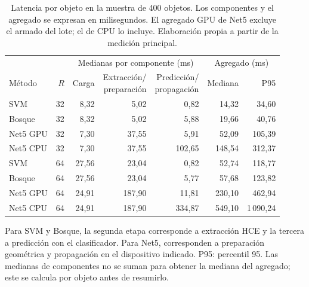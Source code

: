 \begin{table}[htbp]\centering\small
\caption{Latencia por objeto en la muestra de 400 objetos. Los componentes y el agregado se expresan en milisegundos. El agregado GPU de Net5 excluye el armado del lote; el de CPU lo incluye. Elaboración propia a partir de la medición principal.}\label{tab:latencia-final}
\setlength{\tabcolsep}{3pt}
\begin{tabular}{@{}lr rrr rr@{}}\toprule
& & \multicolumn{3}{c}{Medianas por componente (ms)} & \multicolumn{2}{c}{Agregado (ms)} \\
\cmidrule(lr){3-5}\cmidrule(l){6-7}
Método & $R$ & Carga & \shortstack{Extracción/\\preparación} & \shortstack{Predicción/\\propagación} & Mediana & P95 \\\midrule
SVM & 32 & 8,32 & 5,02 & 0,82 & 14,32 & 34,60 \\
Bosque & 32 & 8,32 & 5,02 & 5,88 & 19,66 & 40,76 \\
Net5 GPU & 32 & 7,30 & 37,55 & 5,91 & 52,09 & 105,39 \\
Net5 CPU & 32 & 7,30 & 37,55 & 102,65 & 148,54 & 312,37 \\
SVM & 64 & 27,56 & 23,04 & 0,82 & 52,74 & 118,77 \\
Bosque & 64 & 27,56 & 23,04 & 5,77 & 57,68 & 123,82 \\
Net5 GPU & 64 & 24,91 & 187,90 & 11,81 & 230,10 & 462,94 \\
Net5 CPU & 64 & 24,91 & 187,90 & 334,87 & 549,10 & 1\,090,24 \\
\bottomrule\end{tabular}
\par\smallskip\begin{minipage}{\textwidth}\footnotesize
Para SVM y Bosque, la segunda etapa corresponde a extracción HCE y la tercera a predicción con el clasificador. Para Net5, corresponden a preparación geométrica y propagación en el dispositivo indicado. P95: percentil 95. Las medianas de componentes no se suman para obtener la mediana del agregado; este se calcula por objeto antes de resumirlo.\end{minipage}
\end{table}
